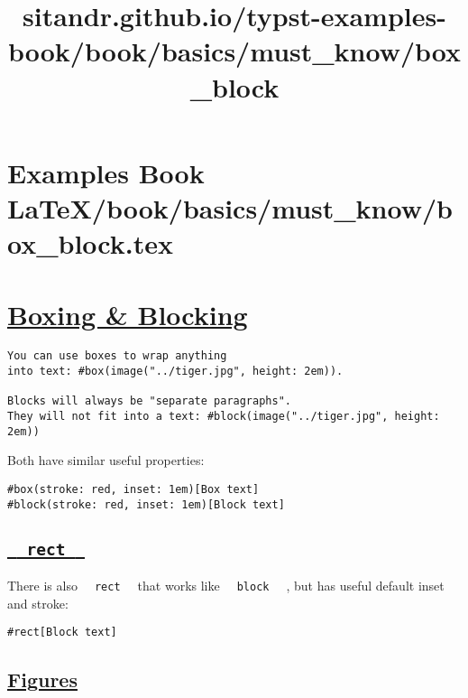 \section{Examples Book LaTeX/book/basics/must_know/box_block.tex}
\title{sitandr.github.io/typst-examples-book/book/basics/must_know/box_block}

\section{\texorpdfstring{\hyperref[boxing--blocking]{Boxing \&
Blocking}}{Boxing \& Blocking}}\label{boxing--blocking}

\begin{verbatim}
You can use boxes to wrap anything
into text: #box(image("../tiger.jpg", height: 2em)).

Blocks will always be "separate paragraphs".
They will not fit into a text: #block(image("../tiger.jpg", height: 2em))
\end{verbatim}

\pandocbounded{}

Both have similar useful properties:

\begin{verbatim}
#box(stroke: red, inset: 1em)[Box text]
#block(stroke: red, inset: 1em)[Block text]
\end{verbatim}

\pandocbounded{}

\subsection{\texorpdfstring{\hyperref[rect]{\texttt{\ }{\texttt{\ rect\ }}\texttt{\ }}}{  rect  }}\label{rect}

There is also \texttt{\ }{\texttt{\ rect\ }}\texttt{\ } that works like
\texttt{\ }{\texttt{\ block\ }}\texttt{\ } , but has useful default
inset and stroke:

\begin{verbatim}
#rect[Block text]
\end{verbatim}

\pandocbounded{}

\subsection{\texorpdfstring{\hyperref[figures]{Figures}}{Figures}}\label{figures}

